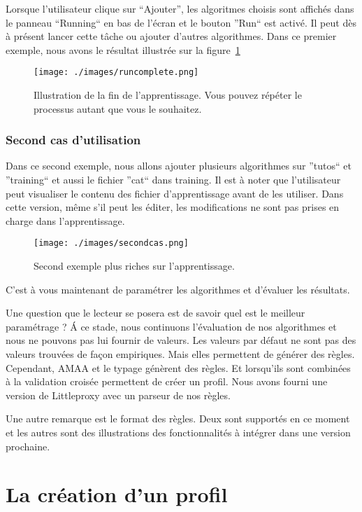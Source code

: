 \documentclass[a4paper,10pt,justified]{book}
\begin{document}
Lorsque l'utilisateur clique sur ``Ajouter'', les algoritmes choisis sont affichés dans le panneau ``Running`` en bas de l'écran et le bouton ''Run`` est activé. 
Il peut dès à présent lancer cette tâche ou ajouter d'autres algorithmes. 
Dans ce premier exemple, nous avons le résultat illustrée sur la figure~\ref{runcomplete}

\begin{figure}
\texttt{[image: ./images/runcomplete.png]}
\label{runcomplete}
\caption{Illustration de la fin de l'apprentissage. Vous pouvez répéter le processus autant que vous le souhaitez.}
\end{figure}


\subsection{Second cas d'utilisation}
Dans ce second exemple, nous allons ajouter plusieurs algorithmes sur ''tutos`` et ''training`` et aussi le fichier ''cat``  dans training. 
Il est à noter que l'utilisateur peut visualiser le contenu des fichier d'apprentissage avant de les utiliser. 
Dans cette version, même s'il peut les éditer, les modifications ne sont pas prises en charge dans l'apprentissage. 

\begin{figure}
\texttt{[image: ./images/secondcas.png]}
\label{secondcas}
\caption{Second exemple plus riches sur l'apprentissage.}
\end{figure}
C'est à vous maintenant de paramétrer les algorithmes et d'évaluer les résultats. 

Une question que le lecteur se posera est de savoir quel est le meilleur paramétrage ? \'A ce stade, nous continuons l’évaluation de nos algorithmes et nous ne pouvons pas lui fournir de  valeurs.
Les valeurs par défaut ne sont pas des valeurs trouvées de façon empiriques. Mais elles permettent de générer des règles. 
Cependant, AMAA et le typage génèrent des règles. Et lorsqu'ils sont combinées à la validation croisée permettent de créer un profil. 
Nous avons fourni une version de Littleproxy avec un parseur de nos règles.  

Une autre remarque est le format des règles. Deux sont supportés en ce moment et les autres sont des illustrations des fonctionnalités à intégrer dans une  version prochaine. 

\chapter{La création d'un profil}
\end{document}
